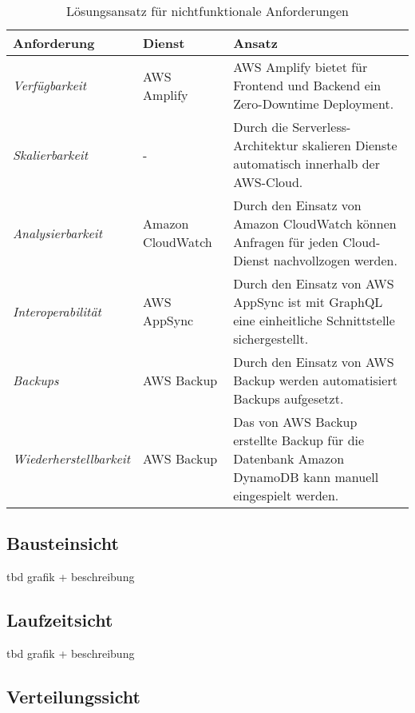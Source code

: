 \begin{table}[h]
  \caption{Lösungsansatz für nichtfunktionale Anforderungen}
  \label{Kap2:Teildisziplinen}
  \renewcommand{\arraystretch}{1.2}
  \centering
  \sffamily
  \begin{footnotesize}
    \begin{tabularx}{0.9\textwidth}{l l X}
      \toprule
      \textbf{Anforderung} & \textbf{Dienst} & \textbf{Ansatz}\\
      \midrule
        \emph{Verfügbarkeit} & AWS Amplify & AWS Amplify bietet für Frontend und Backend ein Zero-Downtime Deployment. \\
        \emph{Skalierbarkeit} & - & Durch die Serverless-Architektur skalieren Dienste automatisch innerhalb der \ac{AWS}-Cloud.\\
        \emph{Analysierbarkeit} & Amazon CloudWatch & Durch den Einsatz von Amazon CloudWatch können Anfragen für jeden Cloud-Dienst nachvollzogen werden.\\
        \emph{Interoperabilität} & AWS AppSync & Durch den Einsatz von AWS AppSync ist mit GraphQL eine einheitliche Schnittstelle sichergestellt.\\
        \emph{Backups} & AWS Backup & Durch den Einsatz von AWS Backup werden automatisiert Backups aufgesetzt.\\
        \emph{Wiederherstellbarkeit} & AWS Backup &  Das von AWS Backup erstellte Backup für die Datenbank Amazon DynamoDB kann manuell eingespielt werden.\\
      \bottomrule
    \end{tabularx}
  \end{footnotesize}
  \rmfamily
\end{table}

\subsection{Bausteinsicht}

tbd grafik + beschreibung

\subsection{Laufzeitsicht}

tbd grafik + beschreibung

\subsection{Verteilungssicht}

